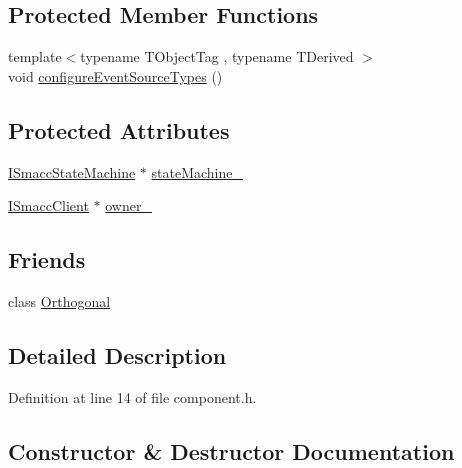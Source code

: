 \subsection*{Protected Member Functions}
\begin{DoxyCompactItemize}
\item 
{\footnotesize template$<$typename T\+Object\+Tag , typename T\+Derived $>$ }\\void \hyperlink{classsmacc_1_1ISmaccComponent_ad1c9ede43be1f83c10c6e7a2e14db8d3}{configure\+Event\+Source\+Types} ()
\end{DoxyCompactItemize}
\subsection*{Protected Attributes}
\begin{DoxyCompactItemize}
\item 
\hyperlink{classsmacc_1_1ISmaccStateMachine}{I\+Smacc\+State\+Machine} $\ast$ \hyperlink{classsmacc_1_1ISmaccComponent_ae3f37acc1679f79299b86872d4b1f80f}{state\+Machine\+\_\+}
\item 
\hyperlink{classsmacc_1_1ISmaccClient}{I\+Smacc\+Client} $\ast$ \hyperlink{classsmacc_1_1ISmaccComponent_a909590e672450ce0eb0d8facb45c737a}{owner\+\_\+}
\end{DoxyCompactItemize}
\subsection*{Friends}
\begin{DoxyCompactItemize}
\item 
class \hyperlink{classsmacc_1_1ISmaccComponent_ab3e0a1388d84ea577a59f487cbfc08e3}{Orthogonal}
\end{DoxyCompactItemize}


\subsection{Detailed Description}


Definition at line 14 of file component.\+h.



\subsection{Constructor \& Destructor Documentation}
